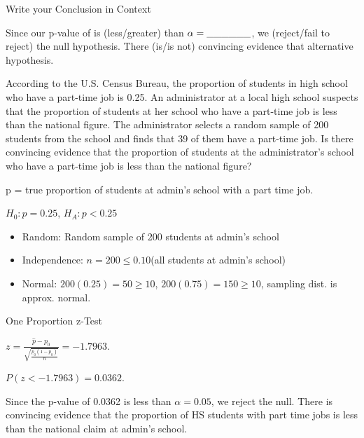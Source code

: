 \documentclass[../stats.tex]{subfiles}
\begin{document}
Write your Conclusion in Context 

Since our p-value of \blank is (less/greater) than $\alpha = \_\_\_\_\_\_$, we (reject/fail to reject) the null hypothesis. There (is/is not) convincing evidence that {alternative hypothesis}.

\begin{example}
    According to the U.S. Census Bureau, the proportion of students in high school who have a part-time job is 0.25. An administrator at a local high school suspects that the proportion of students at her school 
    who have a part-time job is less than the national figure. The administrator selects a random sample of 200 students from the school and finds that 39 of them have a part-time job. Is there convincing evidence that the proportion of students at the administrator's school who have a part-time job is less than the national figure?

    p = true proportion of students at admin's school with a part time job.

    $H_0: p=0.25$, $H_A: p<0.25$

    \begin{itemize}
        \item Random: Random sample of 200 students at admin's school 
        \item Independence: $n=200\leq 0.10$(all students at admin's school)
        \item Normal: $200(0.25)=50\geq 10$, $200(0.75)=150\geq 10$, sampling dist. is approx. normal.
    \end{itemize}

    One Proportion z-Test 

    $z=\frac{\hat{p}-p_0}{\sqrt{\frac{p_0(1-p_0)}{n}}}=-1.7963$. 

    $P(z<-1.7963)=0.0362$.

    Since the p-value of 0.0362 is less than $\alpha=0.05$, we reject the null. There is convincing evidence that the proportion of HS students with part time jobs is less than the national claim at admin's school.
\end{example}
\end{document}
